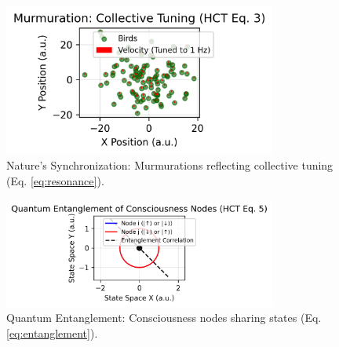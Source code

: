 \documentclass[a4paper,12pt]{article}
\begin{document}
\begin{figure}[h]
    \centering
    \includegraphics[width=0.8\textwidth]{figures/nature_sync.png}
    \caption{Nature’s Synchronization: Murmurations reflecting collective tuning (Eq. \ref{eq:resonance}).}
    \label{fig:nature_sync}
\end{figure}

\begin{figure}[h]
    \centering
    \includegraphics[width=0.8\textwidth]{figures/quantum_entanglement.png}
    \caption{Quantum Entanglement: Consciousness nodes sharing states (Eq. \ref{eq:entanglement}).}
    \label{fig:quantum_entanglement}
\end{figure}



\end{document}
